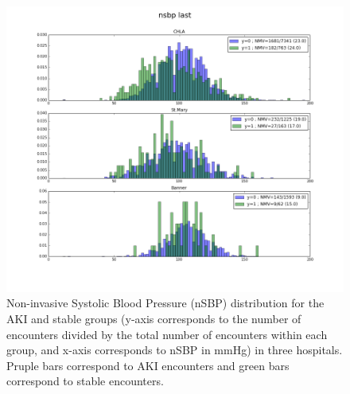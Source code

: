 \documentclass[
   technote
]{phildoc}
\begin{document}



\begin{figure}[!htbp]
\centering
\includegraphics[width=\textwidth]{./figures/nsbp_last.png}
\caption{Non-invasive Systolic Blood Pressure (nSBP) distribution for the AKI and stable groups (y-axis corresponds to the number of encounters divided by the total number of encounters within each group, and x-axis corresponds to nSBP in mmHg) in three hospitals. Pruple bars correspond to AKI encounters and green bars correspond to stable encounters.} 
\label{fig:nsbp_dist}      
\end{figure}
\end{document}

